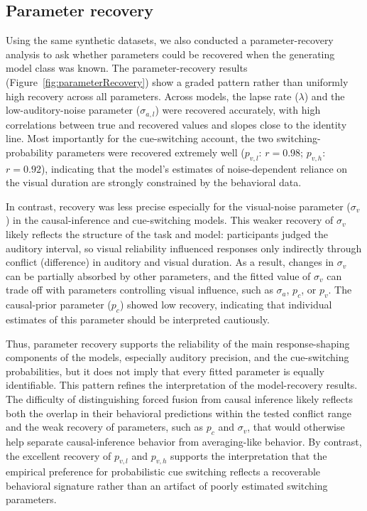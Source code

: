 \documentclass{biorxiv}
\begin{document}
\subsection{Parameter recovery}

Using the same synthetic datasets, we also conducted a parameter-recovery analysis to ask whether parameters could be recovered when the generating model class was known. The parameter-recovery results (Figure~\ref{fig:parameterRecovery}) show a graded pattern rather than uniformly high recovery across all parameters. Across models, the lapse rate ($\lambda$) and the low-auditory-noise parameter ($\sigma_{a,l}$) were recovered accurately, with high correlations between true and recovered values and slopes close to the identity line. Most importantly for the cue-switching account, the two switching-probability parameters were recovered extremely well ($p_{v,l}$: $r = 0.98$; $p_{v,h}$: $r = 0.92$), indicating that the model's estimates of noise-dependent reliance on the visual duration are strongly constrained by the behavioral data.

In contrast, recovery was less precise especially for the visual-noise parameter ($\sigma_v$) in the causal-inference and cue-switching models. This weaker recovery of $\sigma_v$ likely reflects the structure of the task and model: participants judged the auditory interval, so visual reliability influenced responses only indirectly through conflict (difference) in auditory and visual duration. As a result, changes in $\sigma_v$ can be partially absorbed by other parameters, and the fitted value of $\sigma_v$ can trade off with parameters controlling visual influence, such as $\sigma_a$, $p_c$, or $p_v$. The causal-prior parameter ($p_c$) showed low recovery, indicating that individual estimates of this parameter should be interpreted cautiously.

Thus, parameter recovery supports the reliability of the main response-shaping components of the models, especially auditory precision, and the cue-switching probabilities, but it does not imply that every fitted parameter is equally identifiable. This pattern refines the interpretation of the model-recovery results. The difficulty of distinguishing forced fusion from causal inference likely reflects both the overlap in their behavioral predictions within the tested conflict range and the weak recovery of parameters, such as $p_c$ and $\sigma_v$, that would otherwise help separate causal-inference behavior from averaging-like behavior. By contrast, the excellent recovery of $p_{v,l}$ and $p_{v,h}$ supports the interpretation that the empirical preference for probabilistic cue switching reflects a recoverable behavioral signature rather than an artifact of poorly estimated switching parameters.
\end{document}
